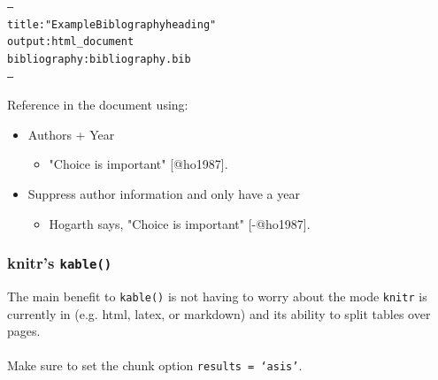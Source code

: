 \documentclass{beamer}\usepackage[]{graphicx}\usepackage[]{color}
\makeatletter
\newcommand{\hlstr}[1]{\textcolor[rgb]{0.192,0.494,0.8}{#1}}%
\newenvironment{kframe}{%
 \def\at@end@of@kframe{}%
 \ifinner\ifhmode%
  \def\at@end@of@kframe{\end{minipage}}%
  \begin{minipage}{\columnwidth}%
 \fi\fi%
 \def\FrameCommand##1{\hskip\@totalleftmargin \hskip-\fboxsep
 \colorbox{shadecolor}{##1}\hskip-\fboxsep
     \hskip-\linewidth \hskip-\@totalleftmargin \hskip\columnwidth}%
 \MakeFramed {\advance\hsize-\width
   \@totalleftmargin\z@ \linewidth\hsize
   \@setminipage}}%
 {\par\unskip\endMakeFramed%
 \at@end@of@kframe}
\newenvironment{knitrout}{}{} %
\makeatother
\begin{document}
\begin{frame}[fragile]
\frametitle{}

\begin{knitrout}
\color{fgcolor}\begin{kframe}
\begin{alltt}
---
title: \hlstr{"Example Biblography heading"}
output: html_document
bibliography: bibliography.bib
---
\end{alltt}
\end{kframe}
\end{knitrout}

Reference in the document using: 

\begin{itemize}
\item Authors + Year
\begin{itemize}
\item "Choice is important" [@ho1987].
\end{itemize}
\item Suppress author information and only have a year
\begin{itemize}
\item Hogarth says, "Choice is important" [-@ho1987].
\end{itemize}
\end{itemize}

\end{frame}



\begin{frame}[fragile]
\frametitle{knitr's \texttt{kable()}}
The main benefit to \texttt{kable()} is not having to worry about the mode \texttt{knitr} is currently in (e.g. html, latex, or markdown) and its ability to split tables over pages.
\\$ $\\ 
Make sure to set the chunk option \texttt{results = `asis'}.
\end{frame}
\end{document}
